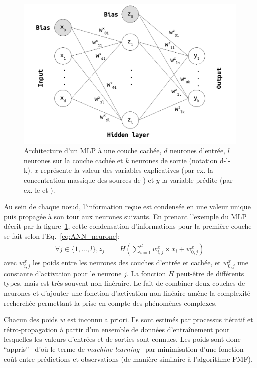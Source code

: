 \begin{figure}[ht]
    \centering
    \includegraphics[width=0.7\linewidth]{figures/chapter05/MLP_architecture.pdf}
    \caption{Architecture d'un MLP à une couche cachée, $d$ neurones d'entrée, $l$
    neurones sur la couche cachée et $k$ neurones de sortie (notation d-l-k). $x$
    représente la valeur des variables explicatives (par ex. la concentration massique des
    sources de \PMdix) et $y$ la variable prédite (par ex. le \POAAv{} et \PODTTv).}%
    \label{fig:MLP_architecture}
\end{figure}

Au sein de chaque nœud, l'information reçue est condensée en une valeur unique puis propagée à
son tour aux neurones suivants. En prenant l'exemple du MLP décrit par la
figure~\ref{fig:MLP_architecture}, cette condensation d'informations pour la première
couche se fait selon l'Eq.~\ref{eq:ANN_neurone}:
\begin{align}
    \label{eq:ANN_neurone}
    \forall j \in \{1, ..., l\}, z_j &= H\left( \sum_{i=1}^d w^x_{i,j} \times x_i + w^x_{0,j} \right)
\end{align}
avec $w^x_{i,j}$ les poids entre les neurones des couches d'entrée et cachée, et
$w^x_{0,j}$ une constante d'activation pour le neurone $j$. La fonction $H$
peut-être de différents types, mais est très souvent non-linéraire. Le fait de combiner
deux
couches de neurones et d'ajouter une fonction d'activation non linéaire amène la
complexité recherchée permettant la prise en compte des phénomènes complexes.

Chacun des poids $w$ est inconnu a priori. Ils sont estimés par processus itératif et
rétro-propagation à partir d'un ensemble de données d'entraînement pour lesquelles les
valeurs d'entrées et de sorties sont connues. Les poids sont donc ``appris'' --d'où le
terme de \textit{machine learning}-- par minimisation d'une fonction coût entre prédictions
et observations (de manière similaire à l'algorithme PMF).


